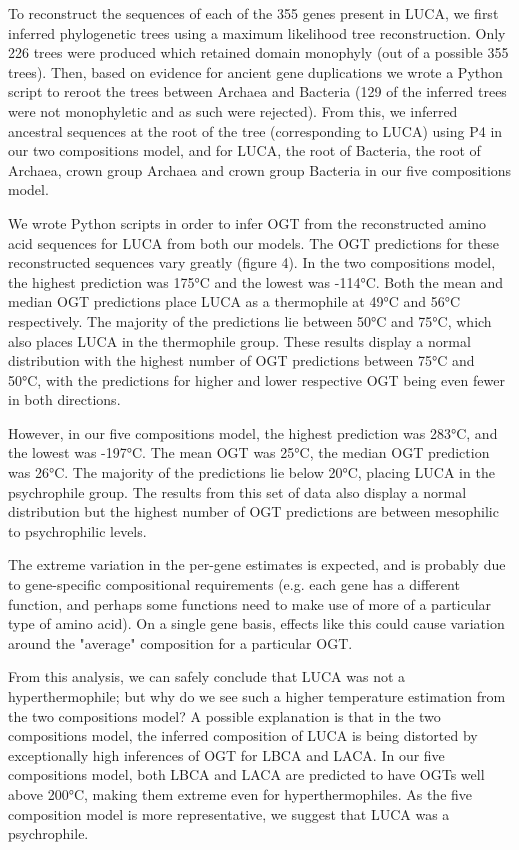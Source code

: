 To reconstruct the sequences of each of the 355 genes present in LUCA, we first inferred phylogenetic trees using a maximum likelihood tree reconstruction. Only 226 trees were produced which retained domain monophyly (out of a possible 355 trees). Then, based on evidence for ancient gene duplications \cite{iwabe1989evolutionary,gogarten1989evolution} we wrote a Python script to reroot the trees between Archaea and Bacteria (129 of the inferred trees were not monophyletic and as such were rejected). From this, we inferred ancestral sequences at the root of the tree (corresponding to LUCA) using P4 \cite{foster2004modeling} in our two compositions model, and for LUCA, the root of Bacteria, the root of Archaea, crown group Archaea and crown group Bacteria in our five compositions model. 

We wrote Python scripts in order to infer OGT from the reconstructed amino acid sequences for LUCA from both our models. The OGT predictions for these reconstructed sequences vary greatly (figure 4). In the two compositions model, the highest prediction was 175°C and the lowest was -114°C. Both the mean and median OGT predictions place LUCA as a thermophile at 49°C and 56°C respectively. The majority of the predictions lie between 50°C and 75°C, which also places LUCA in the thermophile group. These results display a normal distribution with the highest number of OGT predictions between 75°C and 50°C, with the predictions for higher and lower respective OGT being even fewer in both directions.

However, in our five compositions model, the highest prediction was 283°C, and the lowest was -197°C. The mean OGT was 25°C, the median OGT prediction was 26°C. The majority of the predictions lie below 20°C, placing LUCA in the psychrophile group. The results from this set of data also display a normal distribution but the highest number of OGT predictions are between mesophilic to psychrophilic levels. 

The extreme variation in the per-gene estimates is expected, and is probably due to gene-specific compositional requirements (e.g. each gene has a different function, and perhaps some functions need to make use of more of a particular type of amino acid). On a single gene basis, effects like this could cause variation around the "average" composition for a particular OGT.

From this analysis, we can safely conclude that LUCA was not a hyperthermophile; but why do we see such a higher temperature estimation from the two compositions model? A possible explanation is that in the two compositions model, the inferred composition of LUCA is being distorted by exceptionally high inferences of OGT for LBCA and LACA. In our five compositions model, both LBCA and LACA are predicted to have OGTs well above 200°C, making them extreme even for hyperthermophiles. As the five composition model is more representative, we suggest that LUCA was a psychrophile. 

